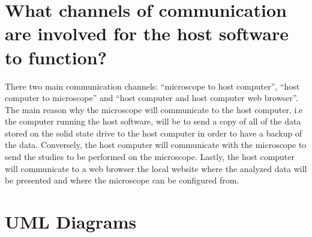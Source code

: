 \documentclass[12pt]{article}
\begin{document}
\section{What channels of communication are involved for the host software to function?}
There two main communication channels: ``microscope to host computer'', ``host computer to microscope'' and ``host computer and host computer web browser''. The main reason why the microscope will communicate to the host computer, i.e the computer running the host software, will be to send a copy of all of the data stored on the solid state drive to the host computer in order to have a backup of the data. Conversely, the host computer will communicate with the microscope to send the studies to be performed on the microscope. Lastly, the host computer will communicate to a web browser the local website where the analyzed data will be presented and where the microscope can be configured from.
\section{UML Diagrams}







\end{document}

